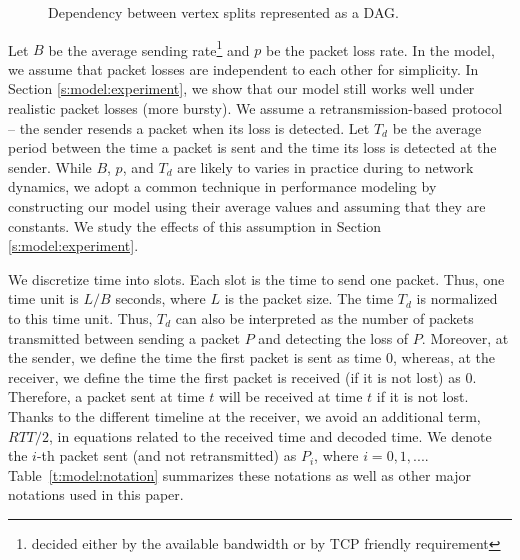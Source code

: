 \begin{figure}
\centering
{}
\caption{Dependency between vertex splits represented as a DAG.\label{model:dag2}}
\end{figure}

    Let $B$ be the average
    sending rate\footnote{decided either by the available bandwidth or by TCP friendly requirement} and $p$ be the packet loss rate.
    In the model, we assume that packet losses are independent to each other for simplicity.
    In Section \ref{s:model:experiment}, we %
    show that our model still works well under realistic packet losses (more bursty).
    We assume a retransmission-based protocol -- the sender resends a packet when its loss is detected.
    Let $T_d$ be the
    average period between the time a packet %
    is sent and the
    time %
    its loss is detected at the sender.
    While $B$, $p$, and $T_d$ are likely to varies in practice during to network dynamics, 
    we adopt a common technique in performance modeling by constructing our model using 
    their average values and assuming that they are constants.
    We study the effects of this assumption in Section \ref{s:model:experiment}.

    We discretize time into slots.  Each slot is the time to
    send one packet.  Thus, one time unit is $L/B$ seconds, where $L$ is the
    packet size.  
    The time $T_d$ is normalized to this
    time unit.  Thus, $T_d$ can also be interpreted as the number
    of packets transmitted between sending a packet $P$ and detecting
    the loss of $P$.  Moreover, at the sender,
    we define the time the first packet is sent as time $0$, whereas, at
    the receiver, we define the time the first packet is received (if it
    is not lost) as $0$.  Therefore, a packet sent at time $t$ will be 
    received at time $t$ if it is not lost.  Thanks to the different 
    timeline at the
    receiver, we avoid an additional term, $RTT/2$, in
    equations related to the received time and decoded time. 
    We denote the $i$-th packet sent (and not retransmitted) as $P_i$, where $i = 0, 1, ...$.
    Table~\ref{t:model:notation} summarizes these notations as well as
    other major notations used in this paper.


